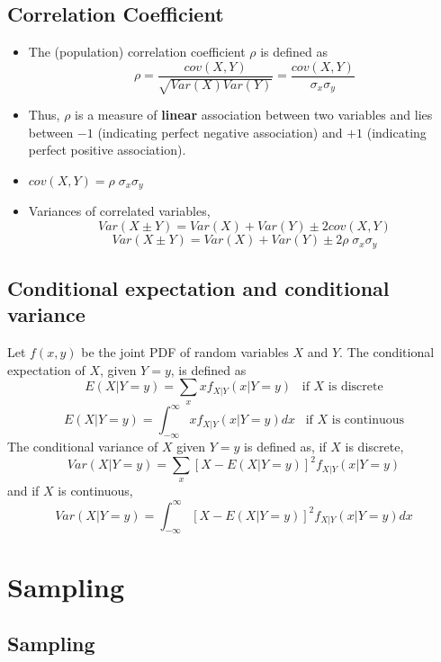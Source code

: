 \documentclass[
]{article}
\providecommand{\tightlist}{%
  \setlength{\itemsep}{0pt}\setlength{\parskip}{0pt}}
\begin{document}
\hypertarget{correlation-coefficient}{%
\subsection{Correlation Coefficient}\label{correlation-coefficient}}

\begin{itemize}
\tightlist
\item
  The (population) correlation coefficient \(\rho\) is defined as
  \[\rho=\frac{cov(X,Y)}{\sqrt{Var(X)Var(Y)}}=\frac{cov(X,Y)}{\sigma_x \sigma_y}\]
\item
  Thus, \(\rho\) is a measure of \textbf{linear} association between two
  variables and lies between \(-1\) (indicating perfect negative
  association) and \(+1\) (indicating perfect positive association).
\item
  \(cov(X,Y)=\rho \;\sigma_x \sigma_y\)
\item
  Variances of correlated variables,
  \[Var(X\pm Y)=Var(X)+Var(Y) \pm 2 cov(X,Y)\]
  \[Var(X\pm Y)=Var(X)+Var(Y) \pm 2 \rho\; \sigma_x \sigma_y\]
\end{itemize}

\hypertarget{conditional-expectation-and-conditional-variance}{%
\subsection{Conditional expectation and conditional
variance}\label{conditional-expectation-and-conditional-variance}}

Let \(f(x,y)\) be the joint PDF of random variables \(X\) and \(Y\). The
conditional expectation of \(X\), given \(Y=y\), is defined as
\[E(X|Y=y)=\sum_x x f_{X|Y}(x|Y=y)\;\;\; \text{if $X$ is discrete}\]
\[E(X|Y=y)=\int_{-\infty}^{\infty} x f_{X|Y}(x|Y=y)dx\;\;\; \text{if $X$ is continuous}\]
The conditional variance of \(X\) given \(Y=y\) is defined as, if \(X\)
is discrete, \[Var(X|Y=y)=\sum_x [X-E(X|Y=y)]^2 f_{X|Y}(x|Y=y)\] and if
\(X\) is continuous,
\[Var(X|Y=y)=\int_{-\infty}^{\infty} [X-E(X|Y=y)]^2 f_{X|Y}(x|Y=y)dx\]

\pagebreak

\hypertarget{sampling}{%
\section{Sampling}\label{sampling}}

\hypertarget{sampling-1}{%
\subsection{Sampling}\label{sampling-1}}
\end{document}
